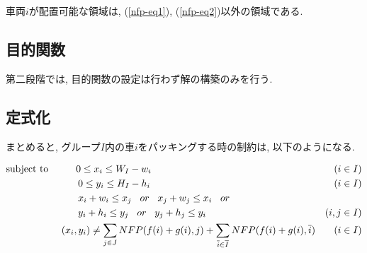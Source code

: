 車両$i$が配置可能な領域は, (\ref{nfp-eq1}), (\ref{nfp-eq2})以外の領域である. 

\subsection{目的関数}
第二段階では, 目的関数の設定は行わず解の構築のみを行う. 

\subsection{定式化}
まとめると, グループ$I$内の車$i$をパッキングする時の制約は, 以下のようになる. 
\begin{center}  
\begin{align}
    & \textrm{subject\ to} \hspace{1cm}0 \leq x_i \leq W_I - w_i & (i \in I)\\
    & \hspace{2.6cm} 0 \leq y_i \leq H_I - h_i & (i \in I)\\
    & \hspace{2.6cm} x_i + w_i \leq x_j \hspace{0.3cm}or\hspace{0.3cm} x_j + w_j \leq x_i \hspace{0.3cm}or \nonumber \\
    & \hspace{2.6cm} y_i + h_i \leq y_j \hspace{0.3cm}or\hspace{0.3cm} y_j + h_j \leq y_i &(i,j \in I)\\
    & \hspace{2cm} (x_i, y_i) \neq \sum_{j \in J} NFP(f(i)+g(i),j) + \sum_{\overline{i} \in \overline{I}}NFP(f(i)+g(i),\overline{i}) & (i \in I)
\end{align}
\end{center}